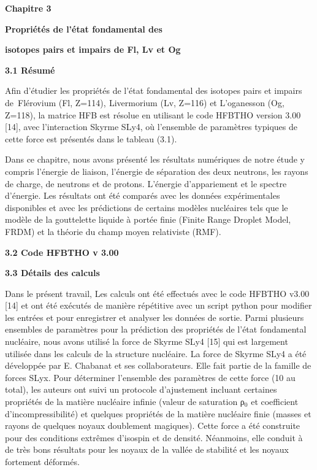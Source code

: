 \documentclass[a4paper]{article}
\title{}
\providecommand\textsubscript[1]{\ensuremath{{}_{\text{#1}}}}
\begin{document}
\textbf{Chapitre 3}

\textbf{Propriétés de l’état fondamental des}

\textbf{isotopes pairs et impairs de Fl, Lv  et Og}

\textbf{3.1 Résumé}

\textbf{ }Afin d'étudier les propriétés de l'état fondamental\textbf{ }des isotopes pairs et impairs  de\textcolor[rgb]{0.1254902,0.12941177,0.13333334}{~Flérovium} (Fl, Z=114),\textbf{\textcolor[rgb]{0.1254902,0.12941177,0.13333334}{ }}\textcolor[rgb]{0.1254902,0.12941177,0.13333334}{Livermorium }(Lv, Z=116) et L’oganesson (Og, Z=118), la matrice HFB est résolue en utilisant le code HFBTHO version 3.00 [14], avec l'interaction Skyrme SLy4, où l’ensemble de paramètres typiques de cette force est présentés dans le tableau (3.1). 

Dans ce chapitre, nous avons présenté les résultats numériques de notre étude y compris l'énergie de liaison, l'énergie de séparation des deux neutrons, les rayons de charge, de neutrons et de protons. L’énergie d’appariement et le spectre d’énergie. Les résultats ont été comparés avec les données expérimentales disponibles et avec les prédictions de certains modèles nucléaires tels que le modèle de la gouttelette liquide à portée finie (Finite Range Droplet Model, FRDM) et la théorie du champ moyen relativiste (RMF).

\textbf{3.2 Code HFBTHO v 3.00} \textbf{ }

\textbf{3.3 Détails des calculs}

 Dans le présent travail, Les calculs ont été effectués avec le code HFBTHO v3.00 [14] et ont été exécutés de manière répétitive avec un script python pour modifier les entrées et pour enregistrer et analyser les données de sortie. Parmi plusieurs ensembles de paramètres pour la prédiction des propriétés de l’état fondamental nucléaire, nous avons utilisé la force de Skyrme SLy4 [15] qui est largement utilisée dans les calculs de la structure nucléaire. La force de Skyrme SLy4 a été développée par E. Chabanat et ses collaborateurs. Elle fait partie de la famille de forces SLyx. Pour déterminer l’ensemble des paramètres de cette force (10 au total), les auteurs ont suivi un protocole d’ajustement incluant certaines propriétés de la matière nucléaire infinie (valeur de saturation ρ\textsubscript{0} et coefficient d’incompressibilité) et quelques propriétés de la matière nucléaire finie (masses et rayons de quelques noyaux doublement magiques). Cette force a été construite pour des conditions extrêmes d’isospin et de densité. Néanmoins, elle conduit à de très bons résultats pour les noyaux de la vallée de stabilité et les noyaux fortement déformés.
\end{document}
